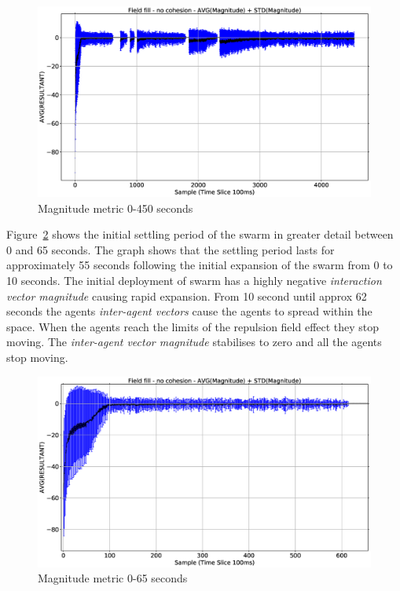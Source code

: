 \begin{figure}[H]
\begin{center}
\includegraphics[width=12cm]{CHAPTER-8/figures/REPELFILL5055-MAG}
\end{center}
\caption{Magnitude metric 0-450 seconds\label{emerge:REPELFILL5055-MAG}}
\end{figure}

Figure~\ref{emerge:REPELFILL5055-MAG-1-2} shows the initial settling period of the swarm in greater detail between 0 and 65 seconds. The graph shows that the settling period lasts for approximately 55 seconds following the initial expansion of the swarm from 0 to 10 seconds. The initial deployment of swarm has a highly negative \textit{interaction vector magnitude} causing rapid expansion. From 10 second until approx 62 seconds the agents \textit{inter-agent vectors} cause the agents to spread within the space. When the agents reach the limits of the repulsion field effect they stop moving. The \textit{inter-agent vector magnitude} stabilises to zero and all the agents stop moving.

\begin{figure}[H]
\begin{center}
\includegraphics[width=12cm]{CHAPTER-8/figures/REPELFILL5055-MAG-1-2}
\end{center}
\caption{Magnitude metric 0-65 seconds\label{emerge:REPELFILL5055-MAG-1-2}}
\end{figure}

